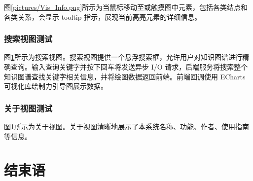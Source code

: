 \documentclass[a4paper,AutoFakeBold,oneside,12pt]{book}
\begin{document}

图\ref{pictures/Vis_Info.png}所示为当鼠标移动至或触摸图中元素，包括各类结点和各类关系，会显示 tooltip 指示，展现当前高亮元素的详细信息。


\subsection{搜索视图测试}

图\ref{}所示为搜索视图。搜索视图提供一个悬浮搜索框，允许用户对知识图谱进行精确查询。输入查询关键字并按下回车将发送异步 I/O 请求，后端服务将搜索整个知识图谱查找关键字相关信息，并将绘图数据返回前端。前端回调使用 ECharts 可视化库绘制力引导图展示数据。


\subsection{关于视图测试}

图\ref{}所示为关于视图。关于视图清晰地展示了本系统名称、功能、作者、使用指南等信息。


\chapter{结束语}

\end{document}
